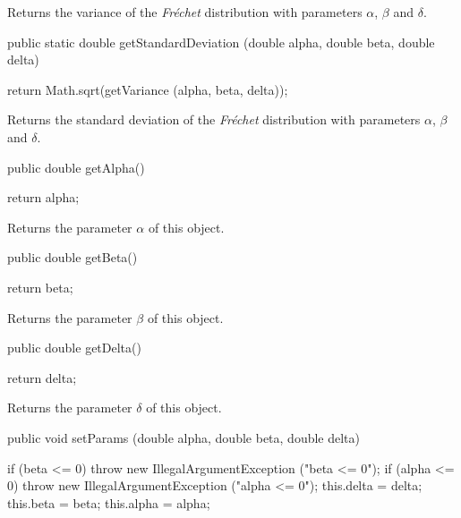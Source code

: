 \begin{tabb}  Returns the variance of the \emph{Fr\'echet} distribution with parameters
   $\alpha$, $\beta$ and $\delta$.
\end{tabb}
\begin{htmlonly}
\end{htmlonly}
\begin{code}

   public static double getStandardDeviation (double alpha, double beta,
                                              double delta)\begin{hide} {
      return  Math.sqrt(getVariance (alpha, beta, delta));
   }\end{hide}
\end{code}
\begin{tabb}  Returns the standard deviation of the \emph{Fr\'echet} distribution
with parameters $\alpha$, $\beta$ and $\delta$.
\end{tabb}
\begin{htmlonly}
\end{htmlonly}
\begin{code}

   public double getAlpha()\begin{hide} {
      return alpha;
   }\end{hide}
\end{code}
  \begin{tabb} Returns the parameter $\alpha$  of this object.
  \end{tabb}
\begin{code}

   public double getBeta()\begin{hide} {
      return beta;
   }\end{hide}
\end{code}
  \begin{tabb} Returns the parameter $\beta$  of this object.
  \end{tabb}
\begin{code}

   public double getDelta()\begin{hide} {
      return delta;
   }
\end{hide}
\end{code}
 \begin{tabb}
   Returns the parameter $\delta$ of this object.
 \end{tabb}
\begin{code}

   public void setParams (double alpha, double beta, double delta)\begin{hide} {
      if (beta <= 0)
         throw new IllegalArgumentException ("beta <= 0");
      if (alpha <= 0)
         throw new IllegalArgumentException ("alpha <= 0");
      this.delta  = delta;
      this.beta = beta;
      this.alpha = alpha;
   }\end{hide}
\end{code}
